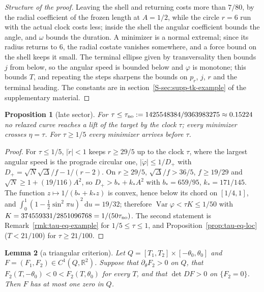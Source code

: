 \documentclass[aip,jmp,amsmath,amssymb,reprint]{revtex4-2}
\newcommand{\dd}{\mathrm{d}}
\theoremstyle{plain}
\newtheorem{proposition}{Proposition}[section]
\newtheorem{lemma}[proposition]{Lemma}
\theoremstyle{definition}
\begin{document}
\begin{proof}[Structure of the proof]
Leaving the shell and returning costs more than $7/80$, by the radial coefficient of the frozen length at
$A=1/2$, while the circle $r=6$ run with the actual clock costs less; inside the shell the angular coefficient
bounds the angle, and $\omega$ bounds the duration. A minimizer is a normal extremal; since its radius
returns to $6$, the radial costate vanishes somewhere, and a force bound on the shell keeps it small. The
terminal ellipse given by transversality then bounds $j$ from below, so the angular speed is bounded below
and $\varphi$ is monotone; this bounds $T$, and repeating the steps sharpens the bounds on $p_r$, $j$, $r$ and
the terminal heading. The constants are in
section~\ref{S-sec:supp-tk-example} of the supplementary material.
\end{proof}

\begin{proposition}[late sector]\label{prop:tau-eq-late}
For $\tau\le\tau_{\rm no}:=1425548384/9363983275\approx0.15224$ no relaxed curve reaches a lift of the
target by the clock $\tau$; every minimizer crosses $\eta=\tau$. For $\tau\ge1/5$ every minimizer arrives
before $\tau$.
\end{proposition}

\begin{proof}
For $\tau\le1/5$, $|\dot r|<1$ keeps $r\ge29/5$ up to the clock $\tau$, where the largest angular speed
is the prograde circular one, $|\dot\varphi|\le1/D_+$ with $D_+=\sqrt N\sqrt\Delta/f-1/(r-2)$. On $r\ge29/5$,
$\sqrt\Delta/f>36/5$, $f\ge19/29$ and $\sqrt N\ge1+(19/116)A^2$, so $D_+>b_*+k_*A^2$ with $b_*=659/95$,
$k_*=171/145$. The function $z\mapsto1/(b_*+k_*z)$ is convex, hence below its chord on $[1/4,1]$, and
$\int_0^1(1-\frac12\sin^2\pi u)^2\,\dd u=19/32$; therefore
$\operatorname{Var}\varphi<\tau K\le1/50$ with $K=374559331/2851096768=1/(50\tau_{\rm no})$. The second statement
is Remark~\ref{rmk:tau-eq-example} for $1/5\le\tau\le1$, and Proposition~\ref{prop:tau-eq-loc}
($T<21/100$) for $\tau\ge21/100$.
\end{proof}

\begin{lemma}[a triangular criterion]\label{lem:tau-eq-triang}
Let $Q=[T_1,T_2]\times[-\theta_0,\theta_0]$ and $F=(F_1,F_2)\in C^1(Q,\mathbb R^2)$. Suppose that
$\partial_\theta F_2>0$ on $Q$, that $F_2(T,-\theta_0)<0<F_2(T,\theta_0)$ for every $T$, and that $\det DF>0$ on
$\{F_2=0\}$. Then $F$ has at most one zero in $Q$.
\end{lemma}
\end{document}
